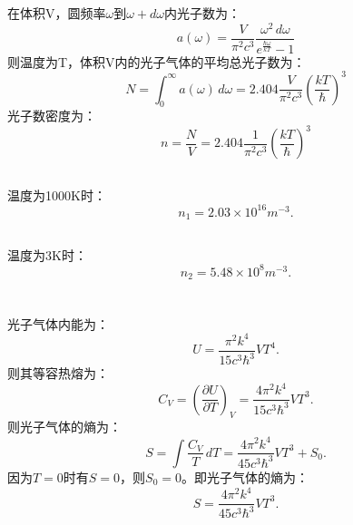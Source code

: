 \documentclass[a4paper,12pt]{article}
\begin{document}
\section{}
在体积V，圆频率$\omega$到$\omega+d\omega$内光子数为：
\begin{equation*}
	a(\omega) = \frac{V}{\pi^2c^3}\frac{\omega^2\,d\omega}{e^{\frac{\hbar\omega}{kT}} - 1}
\end{equation*}
则温度为T，体积V内的光子气体的平均总光子数为：
\begin{equation*}
	N = \int_0^{\infty} a(\omega)\,d\omega = 2.404\frac{V}{\pi^2c^3}\left( \frac{kT}{\hbar} \right)^3
\end{equation*}
光子数密度为：
\begin{equation*}
	n = \frac{N}{V} = 2.404 \frac{1}{\pi^2c^3}\left( \frac{kT}{\hbar} \right)^3
\end{equation*}
\subsection{}
温度为1000K时：
\begin{equation*}
	n_1 = 2.03\times 10^{16}m^{-3}.
\end{equation*}
\subsection{}
温度为3K时：
\begin{equation*}
	n_2 = 5.48\times 10^{8}m^{-3}.
\end{equation*}


\section{}
光子气体内能为：
\begin{equation*}
	U = \frac{\pi^2k^4}{15c^3\hbar^3}VT^4.
\end{equation*}
则其等容热熔为：
\begin{equation*}
	C_V = \left( \frac{\partial U}{\partial T} \right)_V = \frac{4\pi^2k^4}{15c^3\hbar^3}VT^3.
\end{equation*}
则光子气体的熵为：
\begin{equation*}
	S = \int \frac{C_V}{T} \,dT = \frac{4\pi^2k^4}{45c^3\hbar^3}VT^3 + S_0.
\end{equation*}
因为$T = 0$时有$S = 0$，则$S_0 = 0$。即光子气体的熵为：
\begin{equation*}
	S = \frac{4\pi^2k^4}{45c^3\hbar^3}VT^3.
\end{equation*}
\end{document}
